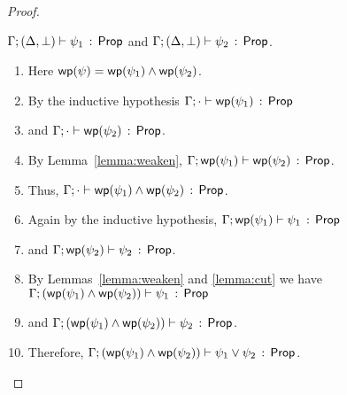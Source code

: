 \documentclass[11pt]{article}
\begin{document}
\begin{proof}
\begin{itemize}
       $\jwfprop{\G}{(\D,\pFalse)}{\p_1}$ and 
              $\jwfprop{\G}{(\D,\pFalse)}{\p_2}$.
      	\begin{enumerate}
		\item
			Here $\wp{\p} = \pAnd{\wp{\p_1}}{\wp{\p_2}}$.
		\item
			By the inductive hypothesis
			$\jwfprop{\G}{\emptyCtx}{\wp{\p_1}}$
		\item	
			and $\jwfprop{\G}{\emptyCtx}{\wp{\p_2}}$.
		\item
		    By Lemma~\ref{lemma:weaken},
		    	$\jwfprop{\G}{\wp{\p_1}}{\wp{\p_2}}$.
		\item
			Thus, 
			$\jwfprop{\G}{\emptyCtx}{\pAnd{\wp{\p_1}}{\wp{\p_2}}}$.
		\item
			Again by the inductive hypothesis,
			$\jwfprop{\G}{\wp{\p_1}}{\p_1}$
		\item
			and
			$\jwfprop{\G}{\wp{\p_2}}{\p_2}$.
		\item
			By Lemmas~\ref{lemma:weaken} and \ref{lemma:cut} we have
			$\jwfprop{\G}{(\pAnd{\wp{\p_1}}{\wp{\p_2}})}{\p_1}$
		\item
			and
			$\jwfprop{\G}{(\pAnd{\wp{\p_1}}{\wp{\p_2}})}{\p_2}$.
		\item
			Therefore,
			$\jwfprop{\G}{(\pAnd{\wp{\p_1}}{\wp{\p_2}})}{\pOr{\p_1}{\p_2}}$.
		\end{enumerate}    
      

\end{itemize}
\end{proof}
\end{document}
